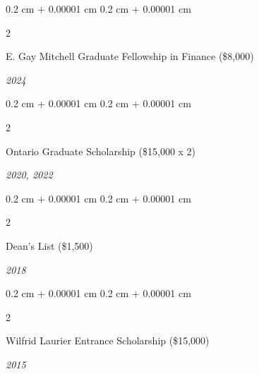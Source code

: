 \documentclass[10pt, letterpaper]{article}
\newenvironment{onecolentry}{
    \begin{adjustwidth}{
        0.2 cm + 0.00001 cm
    }{
        0.2 cm + 0.00001 cm
    }
}{
    \end{adjustwidth}
} %
\newenvironment{twocolentry}[2][]{
    \onecolentry
    \def\secondColumn{#2}
    \setcolumnwidth{\fill, 4.5 cm}
    \begin{paracol}{2}
}{
    \switchcolumn \raggedleft \secondColumn
    \end{paracol}
    \endonecolentry
} %
\let\hrefWithoutArrow\href
\renewcommand{\href}[2]{\hrefWithoutArrow{#1}{\ifthenelse{\equal{#2}{}}{ }{#2 }\raisebox{.15ex}{\footnotesize \faExternalLink*}}}
\begin{document}
        \begin{twocolentry}{
        \textit{2024}
        }
            {E. Gay Mitchell Graduate Fellowship in Finance (\$8,000)}
            
        \end{twocolentry}
        \begin{twocolentry}{
        \textit{2020, 2022}
        }
            {Ontario Graduate Scholarship (\$15,000 x 2)}
            
        \end{twocolentry}
        \begin{twocolentry}{
        \textit{2018}
        }
            {Dean's List (\$1,500)}
            
        \end{twocolentry}
        \begin{twocolentry}{
        \textit{2015}
        }
            {Wilfrid Laurier Entrance Scholarship (\$15,000)}
            
        \end{twocolentry}


        

    
\end{document}
